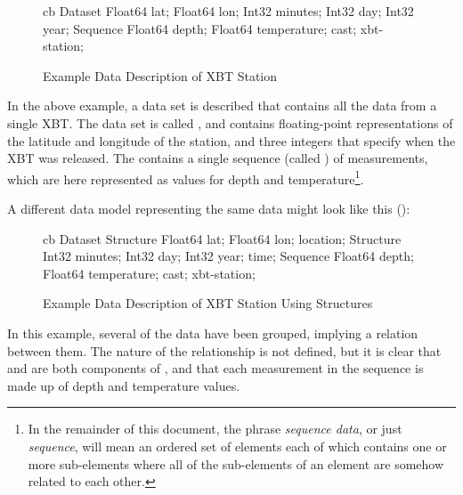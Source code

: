 \begin{figure}[htbp]
\begin{vcode}{cb}
Dataset {
   Float64 lat;
   Float64 lon;
   Int32 minutes;
   Int32 day;
   Int32 year;
   Sequence {
      Float64 depth;
      Float64 temperature;
   } cast;
} xbt-station;
\end{vcode}
\caption{Example Data Description of XBT Station}
\label{fig,data,XBT-DDS}
\end{figure}

In the above example, a data set is described that contains all the
data from a single XBT. The data set is called , and
contains floating-point representations of the latitude and longitude
of the station, and three integers that specify when the XBT was
released. The  contains a single sequence (called
) of measurements, which are here represented as values for
depth and temperature\footnote{In the remainder of this document, the
phrase {\em sequence data}, or just {\em sequence}, 
will mean an
ordered set of elements each of which contains one or more
sub-elements where all of the sub-elements of an element are
somehow related to each other.}.

A different data model representing the same data might look like
this ():

\begin{figure}[htbp]
\begin{vcode}{cb}
Dataset {
   Structure {
      Float64 lat;
      Float64 lon;
   } location;
   Structure {
      Int32 minutes;
      Int32 day;
      Int32 year;
   } time;
   Sequence {
      Float64 depth;
      Float64 temperature;
   } cast;
} xbt-station;
\end{vcode}
\caption{Example Data Description of XBT Station Using Structures}
\label{fig,data,XBT-DDS-struct}
\end{figure}

In this example, several of the data have been grouped, implying a
relation between them. The nature of the relationship is not defined,
but it is clear that  and  are both components of
, and that each measurement in the 
sequence is made up of depth and temperature values.

